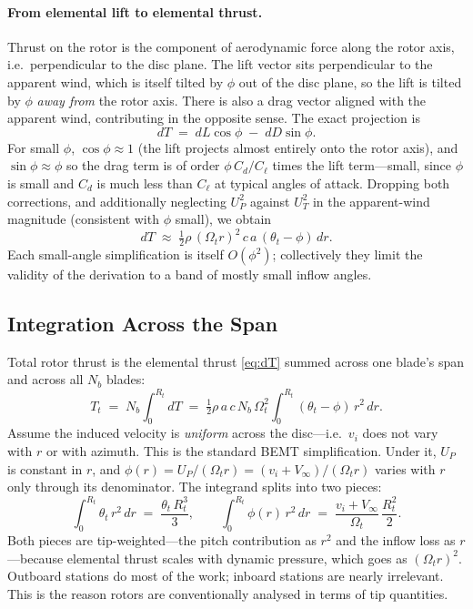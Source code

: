 \documentclass[11pt,a4paper]{article}
\newcommand{\OmegaT}{\Omega_t}
\newcommand{\Rt}{R_t}
\newcommand{\Tt}{T_t}
\newcommand{\thetat}{\theta_t}
\newcommand{\vi}{v_i}
\begin{document}
\paragraph{From elemental lift to elemental thrust.}
Thrust on the rotor is the component of aerodynamic force along the
rotor axis, i.e.\ perpendicular to the disc plane. The lift vector
sits perpendicular to the apparent wind, which is itself tilted by
\(\phi\) out of the disc plane, so the lift is tilted by \(\phi\)
\emph{away from} the rotor axis. There is also a drag vector aligned
with the apparent wind, contributing in the opposite sense. The exact
projection is
\begin{equation}
dT \;=\; dL\cos\phi \;-\; dD\sin\phi.
\end{equation}
For small \(\phi\), \(\cos\phi\approx 1\) (the lift projects almost
entirely onto the rotor axis), and \(\sin\phi\approx\phi\) so the drag
term is of order \(\phi\,C_d/C_\ell\) times the lift term---small,
since \(\phi\) is small and \(C_d\) is much less than \(C_\ell\) at
typical angles of attack. Dropping both corrections, and additionally
neglecting \(U_P^2\) against \(U_T^2\) in the apparent-wind magnitude
(consistent with \(\phi\) small), we obtain
\begin{equation}
dT \;\approx\; \tfrac{1}{2}\rho\,(\OmegaT r)^2\,c\,a\,(\thetat-\phi)\,dr.
\label{eq:dT}
\end{equation}
Each small-angle simplification is itself \(O(\phi^2)\); collectively
they limit the validity of the derivation to a band of mostly small
inflow angles.

\subsection{Integration Across the Span}\label{ssec:integration}

Total rotor thrust is the elemental thrust \eqref{eq:dT} summed across
one blade's span and across all \(N_b\) blades:
\begin{equation}
\Tt \;=\; N_b\!\int_0^{\Rt} dT
     \;=\; \tfrac{1}{2}\rho\,a\,c\,N_b\,\OmegaT^2\!\int_0^{\Rt}\!
           (\thetat - \phi)\,r^2\,dr.
\end{equation}
Assume the induced velocity is \emph{uniform} across the disc---i.e.\
\(\vi\) does not vary with \(r\) or with azimuth. This is the standard
BEMT simplification. Under it, \(U_P\) is constant in \(r\), and
\(\phi(r) = U_P/(\OmegaT r) = (\vi+V_\infty)/(\OmegaT r)\) varies with
\(r\) only through its denominator. The integrand splits into two
pieces:
\begin{equation}
\int_0^{\Rt}\!\thetat\,r^2\,dr \;=\; \frac{\thetat\,\Rt^3}{3},
\qquad
\int_0^{\Rt}\!\phi(r)\,r^2\,dr
  \;=\; \frac{\vi+V_\infty}{\OmegaT}\,\frac{\Rt^2}{2}.
\end{equation}
Both pieces are tip-weighted---the pitch contribution as \(r^2\) and
the inflow loss as \(r\)---because elemental thrust scales with
dynamic pressure, which goes as \((\OmegaT r)^2\). Outboard stations
do most of the work; inboard stations are nearly irrelevant. This is
the reason rotors are conventionally analysed in terms of tip
quantities.
\end{document}
